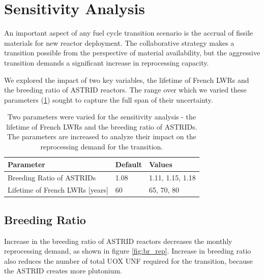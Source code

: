 \section{Sensitivity Analysis}

An important aspect of any fuel cycle transition scenario
is the accrual of fissile materials for new reactor deployment.
The collaborative strategy makes a transition possible 
from the perspective of material availability,
but the aggressive transition demands a significant increase in reprocessing capacity.

We explored the impact of two key variables, the lifetime of French \glspl{LWR} and the
breeding ratio of \gls{ASTRID} reactors. The range over which we varied these parameters (\cref{tab:sen_par})
sought to capture the full span of their uncertainty.

\begin{table}[h]
    \centering
    \begin{tabularx}{\textwidth}{lbb}
        \hline
        \textbf{Parameter} & \textbf{Default} & \textbf{Values} \\
        \hline
        Breeding Ratio of \glspl{ASTRID} & 1.08 & 1.11, 1.15, 1.18 \\ 
        Lifetime of French \glspl{LWR} [years] & 60  & 65, 70, 80 \\
        \hline
    \end{tabularx}
    \caption {Two parameters were varied for the sensitivity analysis - the 
              lifetime of French \glspl{LWR} and the breeding ratio of \glspl{ASTRID}.
              The parameters are increased to analyze their impact on the reprocessing
              demand for the transition.}
    \label{tab:sen_par}
\end{table}

\subsection{Breeding Ratio}

Increase in the breeding ratio of \gls{ASTRID} reactors
decreases the monthly reprocessing demand, as shown in figure \ref{fig:br_rep}.
Increase in breeding ratio also reduces the number of total \gls{UOX} \gls{UNF}
required for the transition, because the \gls{ASTRID} creates more plutonium.


